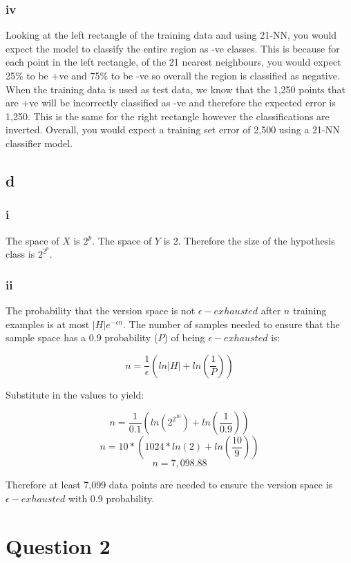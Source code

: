 \documentclass{article}
\begin{document}
\subsubsection*{iv}

Looking at the left rectangle of the training data and using 21-NN, you would expect the model to classify the entire region as -ve classes. 
This is because for each point in the left rectangle, of the 21 nearest neighbours, you would expect 25\% to be +ve and 75\% to be -ve so
overall the region is classified as negative. When the training data is used as test data, we know that the 1,250 points that are +ve will 
be incorrectly classified as -ve and therefore the expected error is 1,250. This is the same for the right rectangle however the classifications
are inverted. Overall, you would expect a training set error of 2,500 using a 21-NN classifier model.

\subsection*{d}

\subsubsection*{i}
The space of \(X\) is \(2^{p}\). The space of \(Y\) is 2. Therefore the size of the hypothesis class is \(2^{2^{p}}\).

\subsubsection*{ii}

The probability that the version space is not \(\epsilon-exhausted\) after \(n\) training examples is at most \(|H|e^{-\epsilon n}\).
The number of samples needed to ensure that the sample space has a 0.9 probability (\(P\)) of being \(\epsilon-exhausted\) is:

\[
    n = \frac{1}{\epsilon}(ln|H| + ln(\frac{1}{P}))
\]

Substitute in the values to yield:

\[
    n = \frac{1}{0.1}(ln(2^{2^{10}}) + ln(\frac{1}{0.9}))
\]
\[
    n = 10*(1024*ln(2) + ln(\frac{10}{9}))
\]
\[
    n = 7,098.88
\]

Therefore at least 7,099 data points are needed to ensure the version space is \(\epsilon-exhausted\) with 0.9 probability.

\newpage
\section*{Question 2}
\end{document}
